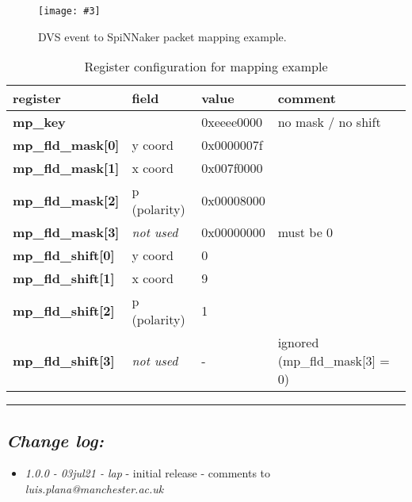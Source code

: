 \documentclass[11pt,a4paper,twoside]{article}
\newcommand{\image}[5][]
{
\begin{figure}[#2]
   \begin{center}
      \texttt{[image: \#3]}
      \caption{#5}
      \label{fig:#4}
   \end{center}
\end{figure}
}
\begin{document}
\image[width = 0.9 \textwidth]{!h}{mapper_ex}{fig:maper_fig}
{DVS event to SpiNNaker packet mapping example.}


\begin{table}[!ht]
	\begin{center}
		\begin{tabular}{| l l l l |}
			\hline
			\textbf{register} & \textbf{field} & \textbf{value} & \textbf{comment}  \\%
			\hline
			\hline
			\textbf{mp\_key}           &                   & 0xeeee0000 & no mask / no shift  \\%
			\textbf{mp\_fld\_mask[0]}  & y coord           & 0x0000007f &                     \\%
			\textbf{mp\_fld\_mask[1]}  & x coord           & 0x007f0000 &                     \\%
			\textbf{mp\_fld\_mask[2]}  & p (polarity)      & 0x00008000 &                     \\%
			\textbf{mp\_fld\_mask[3]}  & \textit{not used} & 0x00000000 & must be 0           \\%
			\textbf{mp\_fld\_shift[0]} & y coord           & 0          &                     \\%
			\textbf{mp\_fld\_shift[1]} & x coord           & 9          &                     \\%
			\textbf{mp\_fld\_shift[2]} & p (polarity)      & 1          &                     \\%
			\textbf{mp\_fld\_shift[3]} & \textit{not used} & -          & ignored (mp\_fld\_mask[3] = 0) \\%
			\hline
		\end{tabular}
		\caption{Register configuration for mapping example}
	\end{center}
	\label{tab:map_regs}
\end{table}


\vspace*{1.0cm}
\rule{\linewidth}{2pt}


\subsection*{\itshape Change log:}


\begin{itemize}
	\item {\itshape 1.0.0 - 03jul21 - lap} - initial release - comments to
	{\itshape luis.plana@manchester.ac.uk}
\end{itemize}
\end{document}
